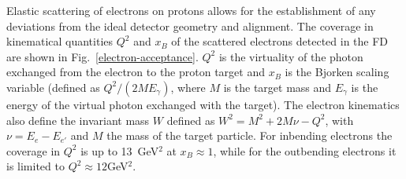 \documentclass[final,3p,twocolumn]{elsarticle}
\begin{document}
Elastic scattering  of electrons on protons allows for the establishment of any deviations from the ideal detector
geometry and alignment. The coverage in kinematical quantities $Q^2$ and $x_B$ of the scattered electrons
detected in the FD are shown in Fig.~\ref{electron-acceptance}. $Q^2$ is the virtuality of the photon exchanged
from the electron to the proton target and $x_B$ is the Bjorken scaling variable (defined as $Q^2/(2 M E_\gamma)$,
where $M$ is the target mass and $E_\gamma$ is the energy of the virtual photon exchanged with the target). 
The electron kinematics also define the invariant mass $W$ defined as $W^2 = M^2 + 2M\nu - Q^2$, with
$\nu = E_e - E_{e'}$ and $M$ the mass of the target particle. 
For
inbending electrons the coverage in $Q^2$ is up to 13~GeV$^2$ at $x_B \approx 1$, while for the outbending
electrons it is limited to  $Q^2 \approx 12$GeV$^2$. 
\end{document}
